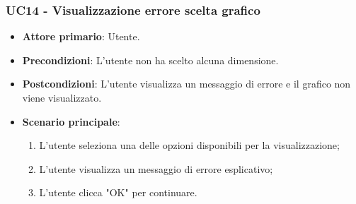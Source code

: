 \subsubsection{UC14 - Visualizzazione errore scelta grafico}
\begin{itemize}
	\item \textbf{Attore primario}: Utente.
	\item \textbf{Precondizioni}: L'utente non ha scelto alcuna dimensione.
	\item \textbf{Postcondizioni}: L'utente visualizza un messaggio di errore e il grafico non viene visualizzato.
	\item \textbf{Scenario principale}:
		\begin{enumerate}
			\item L'utente seleziona una delle opzioni disponibili per la visualizzazione;
			\item L'utente visualizza un messaggio di errore esplicativo;
			\item L'utente clicca "OK" per continuare.
		\end{enumerate}
\end{itemize}